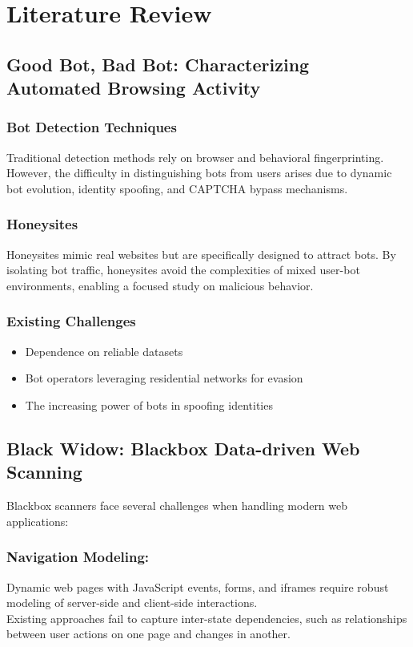 \documentclass[conference]{IEEEtran}
\begin{document}
\section{Literature Review}
\subsection{\textbf{Good Bot, Bad Bot: Characterizing Automated Browsing Activity}}
\subsubsection{Bot Detection Techniques}
Traditional detection methods rely on browser and behavioral fingerprinting. However, the difficulty in distinguishing bots from users arises due to dynamic bot evolution, identity spoofing, and CAPTCHA bypass mechanisms.

\subsubsection{Honeysites}
Honeysites mimic real websites but are specifically designed to attract bots. By isolating bot traffic, honeysites avoid the complexities of mixed user-bot environments, enabling a focused study on malicious behavior.

\subsubsection{Existing Challenges}
\begin{itemize}
\item Dependence on reliable datasets
\item Bot operators leveraging residential networks for evasion
\item The increasing power of bots in spoofing identities
\end{itemize}

\subsection{\textbf{Black Widow: Blackbox Data-driven Web Scanning}}
Blackbox scanners face several challenges when handling modern web applications:
\subsubsection{Navigation Modeling:}
Dynamic web pages with JavaScript events, forms, and iframes require robust modeling of server-side and client-side interactions.\\
Existing approaches fail to capture inter-state dependencies, such as relationships between user actions on one page and changes in another.
\end{document}
